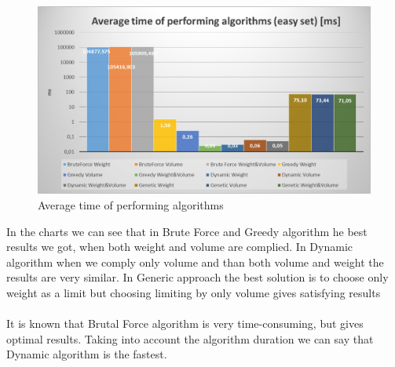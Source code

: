 \documentclass[conference,compsoc]{IEEEtran}
\begin{document}
\begin{figure}[H]
  \centering
  \includegraphics[width=\columnwidth]{image006.png}
  \caption{Average time of performing algorithms}
\end{figure}

In the charts we can see that in Brute Force and Greedy algorithm he best results we got, when both weight and volume are complied. In Dynamic algorithm when we comply only volume and than both volume and weight the results are very similar. In Generic approach the best solution is to choose only weight as a limit but choosing limiting by only volume gives satisfying results\\\\

It is known that Brutal Force algorithm is very time-consuming, but gives optimal results. Taking into account the algorithm duration we can say that Dynamic algorithm is the fastest.
\end{document}

